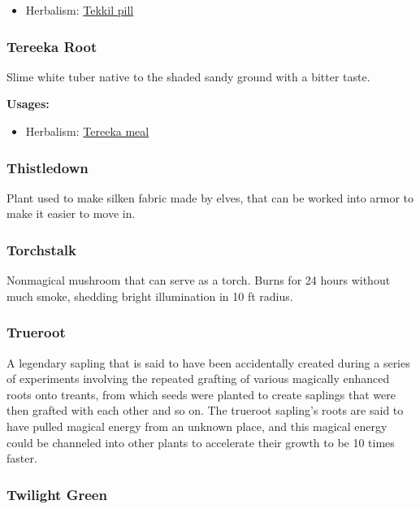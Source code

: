 \begin{itemize}[noitemsep]
\item[] Herbalism: \hyperref[Tekkil pill]{Tekkil pill}
\end{itemize}

\subsubsection{Tereeka Root}
\label{Tereeka Root}

Slime white tuber native to the shaded sandy ground with a bitter taste.

\vspace{5mm}

\textbf{Usages:}

\begin{itemize}[noitemsep]
\item[] Herbalism: \hyperref[Tereeka meal]{Tereeka meal}
\end{itemize}

\subsubsection{Thistledown}

Plant used to make silken fabric made by elves, that can be worked into armor to make it easier to move in.

\subsubsection{Torchstalk}

Nonmagical mushroom that can serve as a torch. Burns for 24 hours without much smoke, shedding bright illumination in 10 ft radius.

\subsubsection{Trueroot}

A legendary sapling that is said to have been accidentally created during a series of experiments involving the repeated grafting of various magically enhanced roots onto treants, from which seeds were planted to create saplings that were then grafted with each other and so on. The trueroot sapling's roots are said to have pulled magical energy from an unknown place, and this magical energy could be channeled into other plants to accelerate their growth to be 10 times faster.

\subsubsection{Twilight Green}
\label{Twilight Green}

